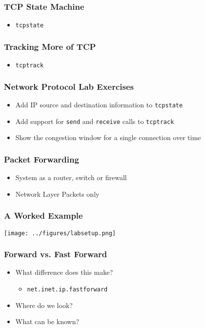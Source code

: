 \documentclass[pdftex]{beamer}
\begin{document}
\begin{frame}[fragile]
  \frametitle{TCP State Machine}
  \begin{itemize}
  \item \verb|tcpstate|
  \end{itemize}
\end{frame}

\begin{frame}[fragile]
  \frametitle{Tracking More of TCP}
  \begin{itemize}
  \item \verb|tcptrack|
  \end{itemize}
\end{frame}

\begin{frame}[fragile]
  \frametitle{Network Protocol Lab Exercises}
  \begin{itemize}
  \item Add IP source and destination information to \verb+tcpstate+
  \item Add support for \verb+send+ and \verb+receive+ calls to \verb+tcptrack+
  \item Show the congestion window for a single connection over time
  \end{itemize}
\end{frame}

\begin{frame}
  \frametitle{Packet Forwarding}
  \begin{itemize}
  \item System as a router, switch or firewall
  \item Network Layer Packets only
  \end{itemize}
\end{frame}

\begin{frame}
  \frametitle{A Worked Example}
      \texttt{[image: ../figures/labsetup.png]}
\end{frame}

\begin{frame}[fragile]
  \frametitle{Forward vs. Fast Forward}
  \begin{itemize}
  \item What difference does this make?
    \begin{itemize}
    \item \verb+net.inet.ip.fastforward+
    \end{itemize}
  \item Where do we look?
  \item What can be known?
  \end{itemize}
\end{frame}
\end{document}
